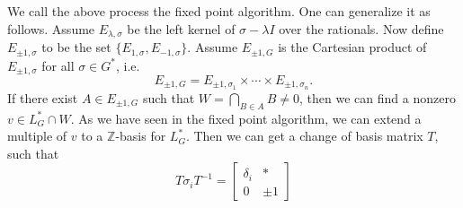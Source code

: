 \documentclass{article}
\theoremstyle{plain}
\newtheorem{proposition}[theorem]{Proposition}
\theoremstyle{definition}
\newcommand{\Z}{\ensuremath{\mathbb{Z}}}
\newcommand*{\QEDA}{\hfill\ensuremath{\blacksquare}}
\begin{document}
\noindent
We call the above process the fixed point algorithm. One can generalize it as follows. Assume $E_{\lambda,\sigma}$ be the left kernel of $\sigma-\lambda I$ over the  rationals. Now define $E_{\pm 1,\sigma}$ to be  the set $\lbrace E_{1,\sigma}, E_{-1,\sigma}\rbrace$. Assume $E_{\pm 1, G}$ is the Cartesian product of $E_{\pm1, \sigma}$ for all $\sigma \in G^*$, i.e. 
$$E_{\pm 1,G} = E_{\pm 1, \sigma_1} \times \cdots \times E_{\pm 1, \sigma_n}.$$ 
If there exist $A\in E_{\pm 1,  G}$ such that $W = \bigcap\limits_{B \in A} B \neq 0$, then we can find a nonzero $v \in L^*_G \cap W$. As we have seen in the fixed point algorithm, we can extend a multiple of $v$ to a $\Z$-basis for $L^*_G$. Then we can get a change of basis matrix $T$, such that 
$$T \sigma_i T^{-1} = \left[ \begin{array}{c|c}
\delta_i & \ast\\
\hline
0 & \pm 1
\end{array}\right]
$$ 
\end{document}
